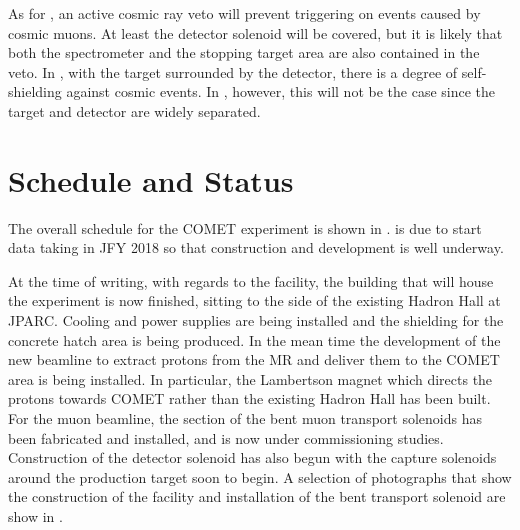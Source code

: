 As for \phaseI, an active cosmic ray veto will prevent triggering on events caused by cosmic muons.
At least the detector solenoid will be covered, but it is likely that both the spectrometer and the stopping target area are also contained in the veto.
In \phaseI, with the target surrounded by the detector, there is a degree of self-shielding against cosmic events. 
In \phaseII, however, this will not be the case since the target and detector are widely separated.


\newcommand{\Component}[6]{
\def\tempshort{#2}
\ifx\tempshort\empty\def\printshort{}\else\def\printshort{(#2)}\fi
\def\tempmag{#3}
\def\tempconstr{#4}
\def\printmag{Magnet names: \emph{#3}}
\def\printconstr{Constructed: \emph{#4}}
\def\printpars{{\small #6}}
\ifx\tempmag\empty%
	\ifx\tempconstr\empty%
		\def\lineone{\printpars}%
		\def\linetwo{}
		\def\linethree{}
	\else%
		\def\lineone{\printconstr}%
		\def\linetwo{\printpars}
		\def\linethree{}
	\fi%
\else%
	\def\lineone{\printmag}%
	\ifx\tempconstr\empty%
		\def\linetwo{\printconstr}
		\def\linethree{}
	\else%
		\def\linetwo{\printconstr}%
		\def\linethree{\printpars}
	\fi%
\fi%
\begin{tabular}{L{0.35\textwidth}|L{0.6\textwidth}}
\multicolumn{2}{L{\textwidth}}{{\bf#1 \printshort}}\\
\lineone& \multirow{3}{0.6\textwidth}{#5}  \\
\linetwo& \\
\linethree& \\ 
\end{tabular}
}


\section{Schedule and Status}
\FigSchedule
The overall schedule for the COMET experiment is shown in .
\phaseI is due to start data taking in \ac{JFY} 2018 so that construction and development is well underway.

\FigStatusFacility
At the time of writing, with regards to the facility, the building that will house the experiment is now finished, sitting to the side of the existing Hadron Hall at \ac{JPARC}.
Cooling and power supplies are being installed and the shielding for the concrete hatch area is being produced.
In the mean time the development of the new beamline to extract protons from the \ac{MR} and deliver them to the COMET area is being installed.
In particular, the Lambertson magnet which directs the protons towards COMET rather than the existing Hadron Hall has been built.
For the muon beamline, the \phaseI section of the bent muon transport solenoids has been fabricated and installed, and is now under commissioning studies.
Construction of the detector solenoid has also begun with the capture solenoids around the production target soon to begin.
A selection of photographs that show the construction of the facility and installation of the bent transport solenoid are show in .

